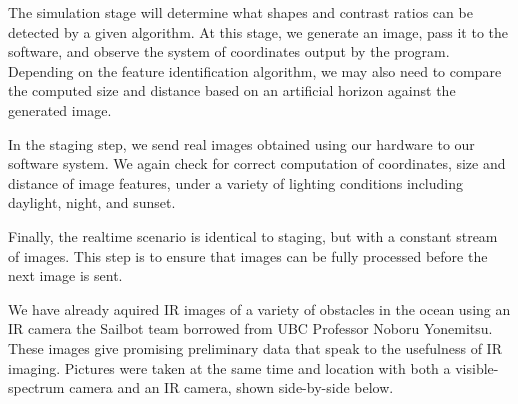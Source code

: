The simulation stage will determine what shapes and contrast ratios can be detected by a given algorithm. At this stage, we generate an image, pass it to the software, and observe the system of coordinates output by the program. Depending on the feature identification algorithm, we may also need to compare the computed size and distance based on an artificial horizon against the generated image.

In the staging step, we send real images obtained using our hardware to our software system. We again check for correct computation of coordinates, size and distance of image features, under a variety of lighting conditions including daylight, night, and sunset.

Finally, the realtime scenario is identical to staging, but with a constant stream of images. This step is to ensure that images can be fully processed before the next image is sent.

We have already aquired IR images of a variety of obstacles in the ocean using an IR camera the Sailbot team borrowed from UBC Professor Noboru Yonemitsu. These images give promising preliminary data that speak to the usefulness of IR imaging. Pictures were taken at the same time and location with both a visible-spectrum camera and an IR camera, shown side-by-side below.

